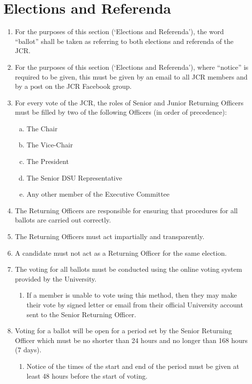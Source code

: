 \documentclass[12pt]{article}  %
\begin{document}
\section{Elections and Referenda}
\begin{enumerate}
	\item For the purposes of this section (‘Elections and Referenda’), the word “ballot” shall be taken as referring to both elections and referenda of the JCR.
	\item For the purposes of this section (‘Elections and Referenda’), where “notice” is required to be given, this must be given by an email to all JCR members and by a post on the JCR Facebook group.
	\item For every vote of the JCR, the roles of Senior and Junior Returning Officers must be filled by two of the following Officers (in order of precedence):
	\begin{enumerate}[(a)]
		\item The Chair
		\item The Vice-Chair
		\item The President
		\item The Senior DSU Representative
		\item Any other member of the Executive Committee
	\end{enumerate}
	\item The Returning Officers are responsible for ensuring that procedures for all ballots are carried out correctly.
	\item The Returning Officers must act impartially and transparently.
	\item A candidate must not act as a Returning Officer for the same election.
	\item The voting for all ballots must be conducted using the online voting system provided by the University.
	\begin{enumerate}
		\item If a member is unable to vote using this method, then they may make their vote by signed letter or email from their official University account sent to the Senior Returning Officer. 
	\end{enumerate}
	\item Voting for a ballot will be open for a period set by the Senior Returning Officer which must be no shorter than 24 hours and no longer than 168 hours (7 days).
	\begin{enumerate}
		\item Notice of the times of the start and end of the period must be given at least 48 hours before the start of voting.

\end{enumerate}
\end{enumerate}
\end{document}
